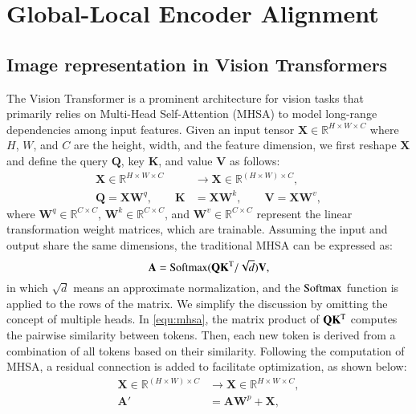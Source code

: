 \section{Global-Local Encoder Alignment}

\subsection{Image representation in Vision Transformers}\label{sec:review}
The Vision Transformer \cite{vaswani2017attention,dosovitskiy2021image} is a prominent architecture for vision tasks that primarily relies on Multi-Head Self-Attention (MHSA) to model long-range dependencies among input features. Given an input tensor $\mathbf{X} \in \mathbb{R}^{H\times W\times C}$  where $H$, $W$, and $C$ are the height, width, and the feature dimension,  
 we first reshape $\mathbf{X}$  and define the query $\mathbf{Q}$, key $\mathbf{K}$, and value $\mathbf{V}$ as follows:
\begin{equation}
\begin{aligned}
\mathbf{X} \in \mathbb{R}^{H\times W\times C} &\to \mathbf{X} \in \mathbb{R}^{(H\times W)\times C}, \\
\mathbf{Q} = \mathbf{X}\mathbf{W}^q, \qquad
\mathbf{K} &= \mathbf{X}\mathbf{W}^k, \qquad
\mathbf{V} = \mathbf{X}\mathbf{W}^v,
\end{aligned}
\end{equation}
where $\mathbf{W}^q \in \mathbb{R}^{C\times C}$, $\mathbf{W}^k \in \mathbb{R}^{C\times C}$, and $\mathbf{W}^v \in \mathbb{R}^{C\times C}$ represent the linear transformation weight matrices, which are trainable. Assuming the input and output share the same dimensions, the traditional MHSA can be expressed as:
\begin{equation}\label{equ:mhsa}
\mathbf{A} = {\rm Softmax}(\mathbf{Q}\mathbf{K}^{\rm T} / \sqrt{d}) \mathbf{V},
\end{equation}
in which $\sqrt{d}$ means an approximate normalization, and the ${\rm Softmax}$ function is applied to the rows of the matrix.
We simplify the discussion by omitting the concept of multiple heads. In \ref{equ:mhsa}, the matrix product of $\mathbf{Q}\mathbf{K}^{\rm T}$ computes the pairwise similarity between tokens. Then, each new token is derived from a combination of all tokens based on their similarity.
Following the computation of  MHSA, a residual connection is added to facilitate optimization, as shown below:
\begin{equation}\label{equ:residual}
\begin{aligned}
\mathbf{X} \in \mathbb{R}^{(H\times W)\times C} &\to \mathbf{X} \in \mathbb{R}^{H\times W\times C}, \\
\mathbf{A'} &= \mathbf{A}\mathbf{W}^p + \mathbf{X},
\end{aligned}
\end{equation}
